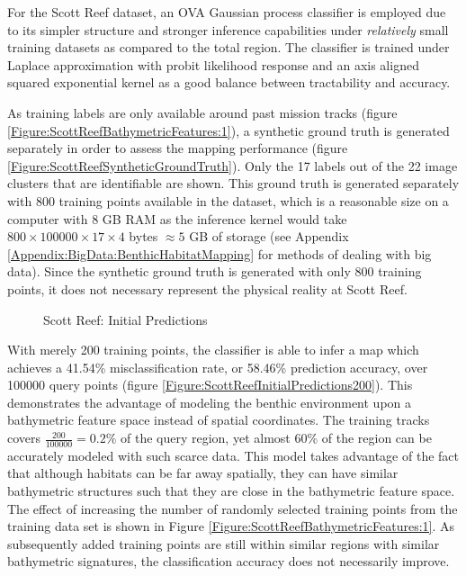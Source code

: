 		For the Scott Reef dataset, an OVA Gaussian process classifier is employed due to its simpler structure and stronger inference capabilities under \textit{relatively} small training datasets as compared to the total region. The classifier is trained under Laplace approximation with probit likelihood response and an axis aligned squared exponential kernel as a good balance between tractability and accuracy.

		As training labels are only available around past mission tracks (figure \ref{Figure:ScottReefBathymetricFeatures:1}), a synthetic ground truth is generated separately in order to assess the mapping performance (figure \ref{Figure:ScottReefSyntheticGroundTruth}). Only the 17 labels out of the 22 image clusters that are identifiable are shown. This ground truth is generated separately with 800 training points available in the dataset, which is a reasonable size on a computer with 8 GB RAM as the inference kernel would take $800 \times 100000 \times 17 \times 4$ bytes $\approx 5$ GB of storage (see Appendix \ref{Appendix:BigData:BenthicHabitatMapping} for methods of dealing with big data). Since the synthetic ground truth is generated with only 800 training points, it does not necessary represent the physical reality at Scott Reef. 

		\begin{figure}[!htbp]
		\centering
		\caption{Scott Reef: Initial Predictions}
		\label{Figure:ScottReefInitialPredictions}
		\end{figure}
		
		With merely 200 training points, the classifier is able to infer a map which achieves a 41.54\% misclassification rate, or 58.46\% prediction accuracy, over 100000 query points (figure \ref{Figure:ScottReefInitialPredictions200}). This demonstrates the advantage of modeling the benthic environment upon a bathymetric feature space instead of spatial coordinates. The training tracks covers $\frac{200}{100000} = 0.2\%$ of the query region, yet almost 60\% of the region can be accurately modeled with such scarce data. This model takes advantage of the fact that although habitats can be far away spatially, they can have similar bathymetric structures such that they are close in the bathymetric feature space. The effect of increasing the number of randomly selected training points from the training data set is shown in Figure \ref{Figure:ScottReefBathymetricFeatures:1}. As subsequently added training points are still within similar regions with similar bathymetric signatures, the classification accuracy does not necessarily improve.
												

